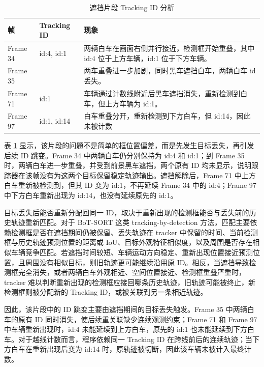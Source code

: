 \documentclass[UTF8,a4paper,12pt]{ctexart}
\begin{document}
\begin{table}[H]
    \centering
    \caption{遮挡片段 Tracking ID 分析}
    \label{tab:occlusion_id_analysis}
    \begin{tabular}{lp{4cm}p{7cm}}
        \toprule
        帧 & Tracking ID & 现象 \\
        \midrule
        Frame 34 & id:4, id:1 & 两辆白车在画面右侧并行接近，检测框开始重叠，其中 id:4 位于上方车辆，id:1 位于下方车辆。 \\
        Frame 35 &  & 两车重叠进一步加剧，同时黑车遮挡白车，两辆白车 id 丢失。 \\
        Frame 71 & id:1 & 车辆通过计数线附近后黑车遮挡消失，重新检测到白车，但上方车辆为 id:1。 \\
        Frame 97 & id:1, id:14 & 白车重叠分开，重新检测到下方白车，但 id:14，因此未被计数 \\
        \bottomrule
    \end{tabular}
\end{table}

表 \ref{tab:occlusion_id_analysis} 显示，该片段的问题不是简单的框位置偏差，而是先发生目标丢失，再引发后续 ID 跳变。Frame 34 中两辆白车仍分别保持为 id:4 和 id:1；到 Frame 35 时，两辆白车进一步重叠，并受到前景黑车遮挡，两个原有 ID 均未显示，说明跟踪器在该帧没有为这两个目标保留稳定轨迹输出。遮挡解除后，Frame 71 中上方白车重新被检测到，但其 ID 变为 id:1，不再延续 Frame 34 中的 id:4；Frame 97 中下方白车重新出现为 id:14，也没有延续原先的 id:1。

目标丢失后能否重新分配回同一 ID，取决于重新出现的检测框能否与丢失前的历史轨迹重新匹配。对于 BoT-SORT 这类 tracking-by-detection 方法，匹配主要依赖检测框是否在遮挡期间仍被保留、丢失轨迹在 tracker 中保留的时间、当前检测框与历史轨迹预测位置的距离或 IoU、目标外观特征相似度，以及周围是否存在相似车辆竞争匹配。若遮挡时间较短、车辆运动方向稳定、重新出现位置接近预测位置，且周围没有相似目标，则旧轨迹更可能继续沿用原 ID。相反，当遮挡导致检测框完全消失，或者两辆白车外观相近、空间位置接近、检测框重叠严重时，tracker 难以判断重新出现的检测框应接回哪条历史轨迹，旧轨迹可能被终止，新检测框则被分配新的 Tracking ID，或被关联到另一条相近轨迹。

因此，该片段中的 ID 跳变主要由遮挡期间的目标丢失触发。Frame 35 中两辆白车的原有 ID 同时消失，使后续重关联缺少连续观测约束；Frame 71 和 Frame 97 中车辆重新出现时，id:4 未能延续到上方白车，原先的 id:1 也未能延续到下方白车。对于越线计数而言，程序依赖同一 Tracking ID 在跨线前后的连续轨迹；当下方白车在重新出现后变为 id:14 时，原轨迹被切断，因此该车辆未被计入最终计数。
\end{document}
